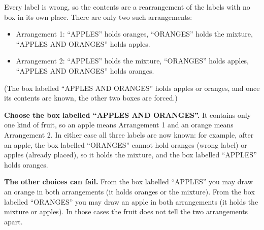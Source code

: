 Every label is wrong, so the contents are a rearrangement of the labels with no box in its own place. There are only two such arrangements:
\begin{itemize}
\item Arrangement 1: ``APPLES'' holds oranges, ``ORANGES'' holds the mixture, ``APPLES AND ORANGES'' holds apples.
\item Arrangement 2: ``APPLES'' holds the mixture, ``ORANGES'' holds apples, ``APPLES AND ORANGES'' holds oranges.
\end{itemize}
(The box labelled ``APPLES AND ORANGES'' holds apples or oranges, and once its contents are known, the other two boxes are forced.)

\textbf{Choose the box labelled ``APPLES AND ORANGES''.} It contains only one kind of fruit, so an apple means Arrangement 1 and an orange means Arrangement 2. In either case all three labels are now known: for example, after an apple, the box labelled ``ORANGES'' cannot hold oranges (wrong label) or apples (already placed), so it holds the mixture, and the box labelled ``APPLES'' holds oranges.

\textbf{The other choices can fail.} From the box labelled ``APPLES'' you may draw an orange in both arrangements (it holds oranges or the mixture). From the box labelled ``ORANGES'' you may draw an apple in both arrangements (it holds the mixture or apples). In those cases the fruit does not tell the two arrangements apart.

